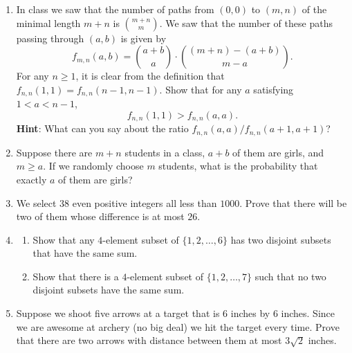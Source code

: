 \documentclass[11pt]{article}
\begin{document}
\begin{enumerate}

\item In class we saw that the number of paths from $(0,0)$ to $(m,n)$ of the minimal length $m+n$ is $\binom{m+n}{m}$.  We saw that the number of these paths passing through $(a,b)$ is given by
\[
f_{m,n}(a,b) = \binom{a+b}{a} \cdot \binom{(m+n)-(a+b)}{m-a}.
\]
For any $n \ge 1$, it is clear from the definition that $f_{n,n}(1,1) = f_{n,n}(n-1,n-1)$. Show that for any $a$ satisfying $1< a < n-1$,
\[
f_{n,n}(1,1)  > f_{n,n}(a,a).
\]
{\bf Hint}: What can you say about the ratio $f_{n,n}(a,a)/f_{n,n}(a+1,a+1)$?

\item Suppose there are $m+n$ students in a class, $a+b$ of them are girls, and $m \ge a$.  If we randomly choose $m$ students, what is the probability that exactly $a$ of them are girls?

\item We select $38$ even positive integers all less than $1000$.  Prove that there will be two of them whose difference is at most $26$.

\item \begin{enumerate}
\item Show that any $4$-element subset of $\{1,2,\ldots, 6\}$ has two disjoint subsets that have the same sum.

\item Show that there is a $4$-element subset of $\{1,2,\ldots, 7\}$ such that no two disjoint subsets have the same sum.
\end{enumerate}

\item Suppose we shoot five arrows at a target that is $6$ inches by $6$ inches.  Since we are awesome at archery (no big deal) we hit the target every time.  Prove that there are two arrows with distance between them at most $3\sqrt{2}$ inches.



\end{enumerate}
\end{document}

